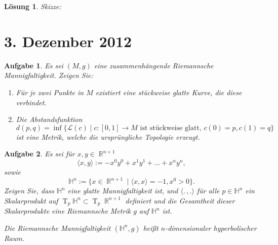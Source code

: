 \documentclass[paper=A4, twoside, chapterprefix=true, bibliography=totoc, headsepline]{scrbook}
\DeclareMathOperator{\R}{\mathbb{R}}
\DeclareMathOperator{\T}{T}         %
\theoremstyle{plain}
\theoremstyle{nonumberplain}
\theoremstyle{empty}
\theoremstyle{break}
\newtheorem{Aufg}{Aufgabe}
\newtheorem{Loes}{L\"osung}
\begin{document}
\begin{Loes}
Skizze:
\begin{center}\end{center}
\end{Loes}


\section{3. Dezember 2012}
\setcounter{Aufg}{0} %
\setcounter{Loes}{0}

\begin{Aufg}
Es sei $(M,g)$ eine zusammenhängende Riemannsche Mannigfaltigkeit. Zeigen Sie:
\begin{enumerate}[label=\alph*),leftmargin=*,widest=b]
\item
	Für je zwei Punkte in $M$ existiert eine stückweise glatte Kurve, die diese verbindet.
\item
	Die Abstandsfunktion 
		\[d(p,q)=\inf\{\mathcal{L}(c) \mid c:[0,1] \to M \text{ ist stückweise glatt, } c(0)=p, c(1)=q\}\]
	ist eine Metrik, welche die ursprüngliche Topologie erzeugt.
\end{enumerate}\end{Aufg}

\begin{Aufg}
Es sei für $x,y\in \R^{n+1}$ 
	\[\langle x,y \rangle:= - x^0 y^0 + x^1 y^1 +\dots + x^n y^n,\]
sowie 
	\[\mathbb{H}^n:= \{x\in \R^{n+1} \mid \langle x,x \rangle =-1, x^0 > 0\}.\]
Zeigen Sie, dass $\mathbb{H}^n$ eine glatte Mannigfaltigkeit ist, und $\langle. \,, . \rangle$ für alle $p\in \mathbb{H}^n$ ein Skalarprodukt auf $\T_p \mathbb{H}^n \subset \T_p \R^{n+1}$   definiert und die Gesamtheit dieser Skalarprodukte eine Riemannsche Metrik $g$ auf $\mathbb{H}^n$ ist.

Die Riemannsche Mannigfaltigkeit $(\mathbb{H}^n, g)$ heißt \emph{$n$-dimensionaler hyperbolischer Raum}.
\end{Aufg}
\end{document}
